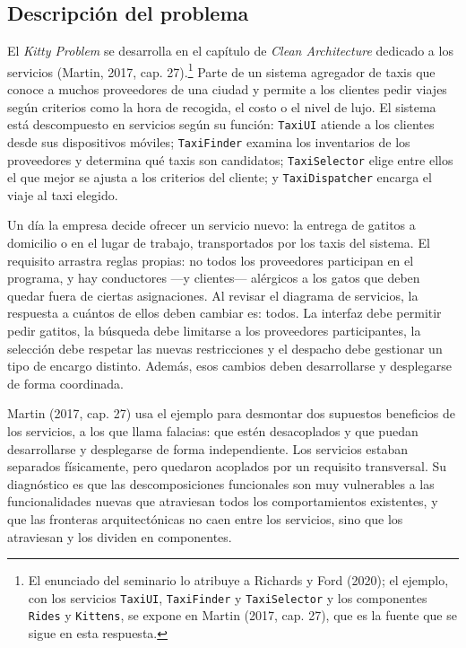 \documentclass[11pt,a4paper]{article}
\begin{document}
\subsection*{Descripción del problema}

El \emph{Kitty Problem} se desarrolla en el capítulo de \emph{Clean Architecture} dedicado a los
servicios (Martin, 2017, cap. 27).\footnote{El enunciado del seminario lo atribuye a Richards y
Ford (2020); el ejemplo, con los servicios \texttt{TaxiUI}, \texttt{TaxiFinder} y
\texttt{TaxiSelector} y los componentes \texttt{Rides} y \texttt{Kittens}, se expone en Martin
(2017, cap. 27), que es la fuente que se sigue en esta respuesta.} Parte de un sistema agregador
de taxis que conoce a muchos proveedores de una ciudad y permite a los clientes pedir viajes
según criterios como la hora de recogida, el costo o el nivel de lujo. El sistema está
descompuesto en servicios según su función: \texttt{TaxiUI} atiende a los clientes desde sus
dispositivos móviles; \texttt{TaxiFinder} examina los inventarios de los proveedores y determina
qué taxis son candidatos; \texttt{TaxiSelector} elige entre ellos el que mejor se ajusta a los
criterios del cliente; y \texttt{TaxiDispatcher} encarga el viaje al taxi elegido.

Un día la empresa decide ofrecer un servicio nuevo: la entrega de gatitos a domicilio o en el
lugar de trabajo, transportados por los taxis del sistema. El requisito arrastra reglas propias:
no todos los proveedores participan en el programa, y hay conductores ---y clientes---
alérgicos a los gatos que deben quedar fuera de ciertas asignaciones. Al revisar el diagrama de
servicios, la respuesta a cuántos de ellos deben cambiar es: todos. La interfaz debe permitir
pedir gatitos, la búsqueda debe limitarse a los proveedores participantes, la selección debe
respetar las nuevas restricciones y el despacho debe gestionar un tipo de encargo distinto.
Además, esos cambios deben desarrollarse y desplegarse de forma coordinada.

Martin (2017, cap. 27) usa el ejemplo para desmontar dos supuestos beneficios de los servicios,
a los que llama falacias: que estén desacoplados y que puedan desarrollarse y desplegarse de
forma independiente. Los servicios estaban separados físicamente, pero quedaron acoplados por un
requisito transversal. Su diagnóstico es que las descomposiciones funcionales son muy
vulnerables a las funcionalidades nuevas que atraviesan todos los comportamientos existentes, y
que las fronteras arquitectónicas no caen entre los servicios, sino que los atraviesan y los
dividen en componentes.
\end{document}
